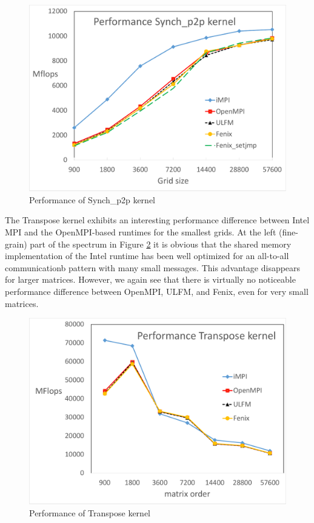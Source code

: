 \begin{figure}
  \centering
  \includegraphics[width=\columnwidth]{p2p_overheads-crop.pdf}
  \caption{Performance of Synch\_p2p kernel}
  \label{fig:p2p}
\end{figure}

The Transpose kernel exhibits an interesting performance difference between
Intel MPI and the OpenMPI-based runtimes for the smallest grids.
At the left (fine-grain) part of the spectrum in Figure \ref{fig:transpose}
it is obvious that the shared memory implementation of the Intel runtime has
been well optimized for an all-to-all communicationb pattern with many small
messages.
This advantage disappears for larger matrices.
However, we again see that there is virtually no noticeable performance
difference between OpenMPI, ULFM, and Fenix, even for very small matrices.

\begin{figure}
  \centering
  \includegraphics[width=\columnwidth]{transpose_overheads-crop.pdf}
  \caption{Performance of Transpose kernel}
  \label{fig:transpose}
\end{figure}

